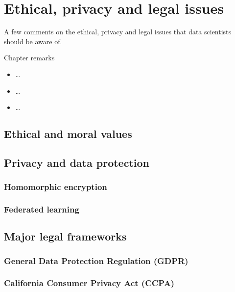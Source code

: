 \chapter{Ethical, privacy and legal issues}


A few comments on the ethical, privacy and legal issues that data scientists should be aware of.

\begin{mainbox}{Chapter remarks}


  \startcontents[chapters]
  \vspace{1em}


  \begin{itemize}
    \item \dots
  \end{itemize}


  \begin{itemize}
    \item \dots
  \end{itemize}


  \begin{itemize}
    \item \dots
  \end{itemize}
\end{mainbox}

{}
\clearpage

\section{Ethical and moral values}

\section{Privacy and data protection}

\subsection{Homomorphic encryption}

\subsection{Federated learning}

\section{Major legal frameworks}

\subsection{General Data Protection Regulation (GDPR)}

\subsection{California Consumer Privacy Act (CCPA)}
